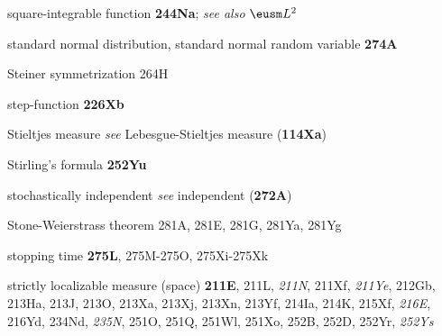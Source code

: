 

square-integrable function {\bf 244Na};
  {\it see also} $\eusm L^2$











  





standard normal distribution, standard normal random variable {\bf
274A}
















Steiner symmetrization 264H





step-function {\bf 226Xb}


Stieltjes measure {\it see}
Lebesgue-Stieltjes measure ({\bf 114Xa})


Stirling's formula {\bf 252Yu}







stochastically independent {\it see} independent ({\bf 272A})














Stone-Weierstrass theorem 281A, 281E, 281G, 281Ya, 281Yg


stopping time {\bf 275L}, 275M-275O, 
275Xi-275Xk








strictly localizable measure (space) {\bf 211E},
211L, {\it 211N}, 211Xf, {\it 211Ye}, 212Gb,
213Ha, 213J, 213O, 213Xa, 213Xj, 213Xn, 213Yf,
214Ia, 214K, 215Xf, {\it 216E}, 216Yd,
234Nd, {\it 235N}, 251O, 251Q, 251Wl, 251Xo, 252B, 252D,
252Yr, {\it 252Ys}









